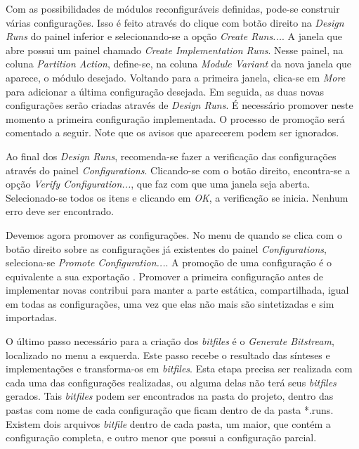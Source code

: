 \documentclass[11pt,a4paper,oneside]{book}
\begin{document}
Com as possibilidades de módulos reconfiguráveis definidas, pode-se construir várias configurações.
Isso é feito através do clique com botão direito na \dlq{}\textit{Design Runs}\drq{} do painel inferior e selecionando-se a opção \dlq{}\textit{Create Runs...}\drq{}.
A janela que abre possui um painel chamado \dlq{}\textit{Create Implementation Runs}\drq{}.
Nesse painel, na coluna \dlq{}\textit{Partition Action}\drq{}, define-se, na coluna \dlq{}\textit{Module Variant}\drq{} da nova janela que aparece, o módulo desejado.
Voltando para a primeira janela, clica-se em \dlq{}\textit{More}\drq{} para adicionar a última configuração desejada.
Em seguida, as duas novas configurações serão criadas através de \dlq{}\textit{Design Runs}\drq{}.
É necessário promover neste momento a primeira configuração implementada.
O processo de promoção será comentado a seguir.
Note que os avisos que aparecerem podem ser ignorados.

Ao final dos \dlq{}\textit{Design Runs}\drq{}, recomenda-se fazer a verificação das configurações através do painel \dlq{}\textit{Configurations}\drq{}.
Clicando-se com o botão direito, encontra-se a opção \dlq{}\textit{Verify Configuration...}\drq{}, que faz com que uma janela seja aberta.
Selecionado-se todos os itens e clicando em \dlq{}\textit{OK}\drq{}, a verificação se inicia.
Nenhum erro deve ser encontrado.

Devemos agora promover as configurações.
No menu de quando se clica com o botão direito sobre as configurações já existentes do painel \dlq{}\textit{Configurations}\drq{}, seleciona-se \dlq{}\textit{Promote Configuration...}\drq{}.
A promoção de uma configuração é o equivalente a sua exportação \cite{ug748}.
Promover a primeira configuração antes de implementar novas contribui para manter a parte estática, compartilhada, igual em todas as configurações, uma vez que elas não mais são sintetizadas e sim importadas.

O último passo necessário para a criação dos \textit{bitfiles} é o \dlq{}\textit{Generate Bitstream}\drq{}, localizado no menu a esquerda.
Este passo recebe o resultado das sínteses e implementações e transforma-os em \textit{bitfiles}.
Esta etapa precisa ser realizada com cada uma das configurações realizadas, ou alguma delas não terá seus \textit{bitfiles} gerados.
Tais \textit{bitfiles} podem ser encontrados na pasta do projeto, dentro das pastas com nome de cada configuração que ficam dentro de da pasta *.runs.
Existem dois arquivos \textit{bitfile} dentro de cada pasta, um maior, que contém a configuração completa, e outro menor que possui a configuração parcial.
\end{document}
